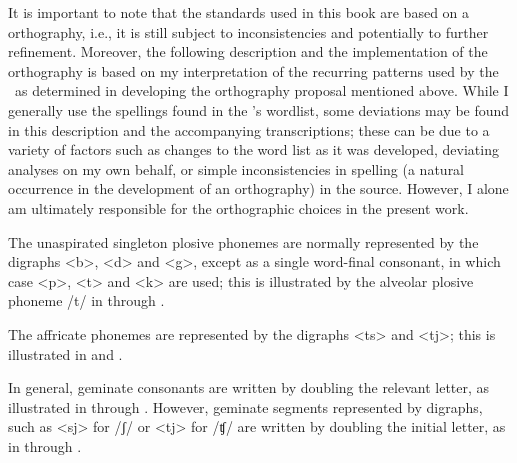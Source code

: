It is important to note that the standards used in this book are based on a  orthography, i.e., it is still subject to inconsistencies and potentially to further refinement. Moreover, the following description and the implementation of the orthography is based on my interpretation of the recurring patterns used by the \WLP\ as determined in developing the orthography proposal mentioned above. While I generally use the spellings found in the \WLP’s wordlist, some deviations may be found in this description and the accompanying transcriptions; these can be due to a variety of factors such as changes to the word list as it was developed, deviating analyses on my own behalf, or simple inconsistencies in spelling (a natural occurrence in the development of an orthography) in the source. However, I alone am ultimately responsible for the orthographic choices in the present work. 


The unaspirated singleton plosive phonemes are normally represented by the digraphs <b>, <d> and <g>, except as a single word-final consonant, in which case <p>, <t> and <k> are used; this is illustrated by the alveolar plosive phoneme /t/ in  through . 
\ea\label{spellExPlos1a}
\z
\ea\label{spellExPlos1b}
\z
\ea\label{spellExPlos1c}
\z

The affricate phonemes are represented by the digraphs <ts> and <tj>; this is illustrated in  and . 
\ea\label{spellEx0a}
\z
\ea\label{spellEx0b}
\z

In general, geminate consonants are written by doubling the relevant letter, as illustrated in  through . 
\ea\label{spellEx1}
\z
\ea\label{spellEx2}
\z
\ea\label{spellEx3}
\z
However, geminate segments represented by digraphs, such as <sj> for /ʃ/ or <tj> for /ʧ/ %
are written by doubling the initial letter, as in  through .
\ea\label{spellEx4}
\z
\ea\label{spellEx5}
\z
\ea\label{spellEx5b}
\z

